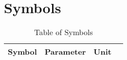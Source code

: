 %
%
\chapter{Symbols}
\begin{longtable}[l]{L{0.5in}L{2.5in}L{1.0in}L{0.1in}} 
\caption{Table of Symbols}
\label{tab:symbols}\\
\hline
Symbol                & Parameter                                    & Unit                                  & \\ 
\hline %


\end{longtable}
